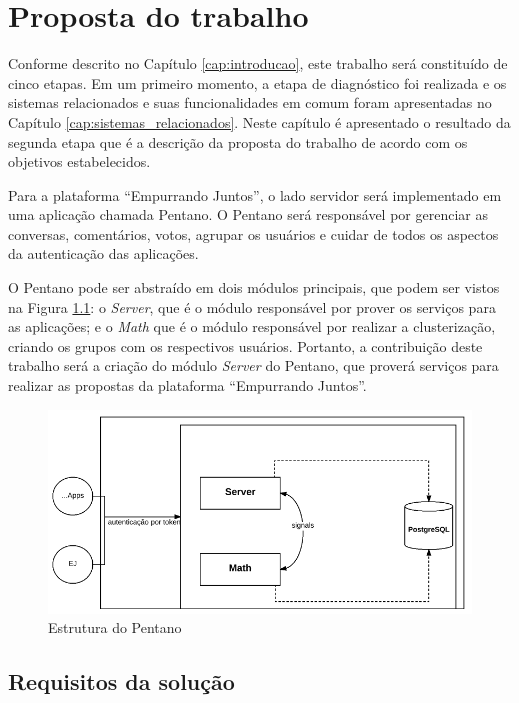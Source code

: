 \chapter{Proposta do trabalho} \label{cap:proposta}

Conforme descrito no Capítulo \ref{cap:introducao}, este trabalho será constituído de cinco etapas.
Em um primeiro momento, a etapa de diagnóstico foi realizada e os sistemas relacionados e suas funcionalidades em comum 
foram apresentadas no Capítulo \ref{cap:sistemas_relacionados}. Neste capítulo é apresentado o resultado da segunda etapa
que é a descrição da proposta do trabalho de acordo com os objetivos estabelecidos.

Para a plataforma ``Empurrando Juntos'', o lado servidor será implementado em uma aplicação chamada Pentano.
O Pentano será responsável por gerenciar as conversas, comentários, votos, agrupar os usuários
e cuidar de todos os aspectos da autenticação das aplicações.

O Pentano pode ser abstraído em dois módulos principais, que podem ser vistos na Figura \ref{fig:pentano}: o \textit{Server}, 
que é o módulo responsável por prover os serviços para as aplicações; e o \textit{Math} que é o módulo responsável por realizar
a clusterização, criando os grupos com os respectivos usuários.
Portanto, a contribuição deste trabalho será a criação do módulo \textit{Server} do Pentano, que proverá serviços para realizar as
propostas da plataforma ``Empurrando Juntos''.

\begin{figure}[h!]
\centering
\includegraphics[scale=0.8]{figuras/esquema_pentano.png}
\caption{Estrutura do Pentano}
\label{fig:pentano}
\end{figure}

\section{Requisitos da solução} \label{sec:requisitos}

